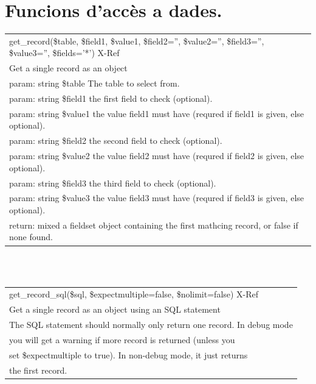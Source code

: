 \documentclass[a4paper]{report}  %
\begin{document}
\section{Funcions d'accès a dades.}\label{annexaccesdades}
\begin{tt}
\begin{center}
   \begin{tabular}{| p{12cm} |}
	\hline
	\rowcolor[gray]{0.5}get\_record(\$table, \$field1, \$value1, \$field2='', \$value2='', \$field3='', \$value3='', \$fields='*') X-Ref\\
	Get a single record as an object\\
	\hline
	param: string \$table The table to select from.\\
	param: string \$field1 the first field to check (optional).\\
	param: string \$value1 the value field1 must have (requred if field1 is given, else optional).\\
	param: string \$field2 the second field to check (optional).\\
	param: string \$value2 the value field2 must have (requred if field2 is given, else optional).\\
	param: string \$field3 the third field to check (optional).\\
	param: string \$value3 the value field3 must have (requred if field3 is given, else optional).\\
	return: mixed a fieldset object containing the first mathcing record, or false if none found.\\
	\hline
	\end{tabular}
	\     \ \\ \     \ \\
   \begin{tabular}{| p{12cm} |}
	\hline
	\rowcolor[gray]{0.5}get\_record\_sql(\$sql, \$expectmultiple=false, \$nolimit=false) X-Ref\\
	Get a single record as an object using an SQL statement\\
	\hline
	The SQL statement should normally only return one record. In debug mode\\
	you will get a warning if more record is returned (unless you\\
	set \$expectmultiple to true). In non-debug mode, it just returns\\
	the first record.\\

\end{tabular}
\end{center}
\end{tt}
\end{document}
